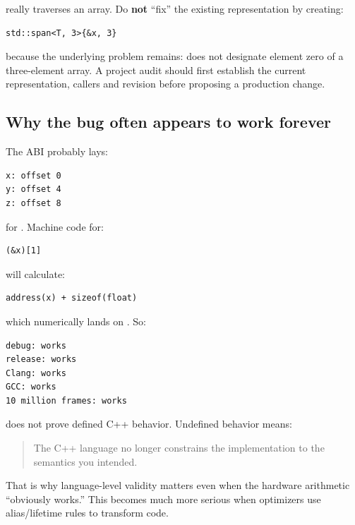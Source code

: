 really traverses an array. Do \textbf{not} ``fix'' the existing representation by creating:

\begin{verbatim}
std::span<T, 3>{&x, 3}
\end{verbatim}

because the underlying problem remains:  does not designate element zero of a three-element  array. A project audit should first establish the current representation, callers and revision before proposing a production change.

\subsection{Why the bug often appears to work forever}\label{05-engine-i-ch003-why-the-bug-often-appears-to-work-forever}

\hypertarget{05-engine-i-ch003-why-the-bug-often-appears-to-work-forever}{}

The ABI probably lays:

\begin{verbatim}
x: offset 0
y: offset 4
z: offset 8
\end{verbatim}

for . Machine code for:

\begin{verbatim}
(&x)[1]
\end{verbatim}

will calculate:

\begin{verbatim}
address(x) + sizeof(float)
\end{verbatim}

which numerically lands on . So:

\begin{verbatim}
debug: works
release: works
Clang: works
GCC: works
10 million frames: works
\end{verbatim}

does not prove defined C++ behavior. Undefined behavior means:

\begin{quote}
The C++ language no longer constrains the implementation to the semantics you intended.
\end{quote}

That is why language-level validity matters even when the hardware arithmetic ``obviously works.'' This becomes much more serious when optimizers use alias/lifetime rules to transform code.

